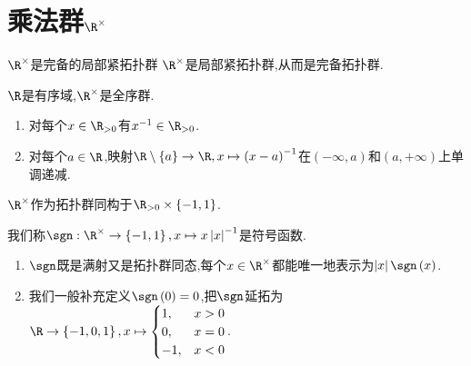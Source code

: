 \section{乘法群\texorpdfstring{$\R^{\times}$}{R*}}

\begin{proposition}{$\R^{\times}$是完备的局部紧拓扑群}{}
	$\R^{\times}$是局部紧拓扑群,从而是完备拓扑群.
\end{proposition}

\begin{proposition}{}{}
	$\R$是有序域,$\R^{\times}$是全序群.
\end{proposition}

\begin{proposition}{}{}
	\begin{enumerate}
		\item 对每个$x\in\R_{>0}$有$x^{-1}\in\R_{>0}$.
		\item 对每个$a\in\R$,映射$\R\setminus\left\{a\right\}\to\R,x\mapsto\left(x-a\right)^{-1}$在$\left(-\infty,a\right)$和$\left(a,+\infty\right)$上单调递减.
	\end{enumerate}
\end{proposition}

\begin{proposition}{}{}
	$\R^{\times}$作为拓扑群同构于$\R_{>0}\times\left\{-1,1\right\}$.
\end{proposition}

\begin{definition}{}{}
	我们称$\sgn:\R^{\times}\to\left\{-1,1\right\},x\mapsto x\left|x\right|^{-1}$是符号函数.
\end{definition}

\begin{remark}{}{}
	\begin{enumerate}
		\item $\sgn$既是满射又是拓扑群同态,每个$x\in\R^{\times}$都能唯一地表示为$\left|x\right|\sgn\left(x\right)$.
		\item 我们一般补充定义$\sgn\left(0\right)=0$,把$\sgn$延拓为$\R\to\left\{-1,0,1\right\},x\mapsto
		\begin{cases}
			1,&x>0\\
			0,&x=0\\
			-1,&x<0
		\end{cases}$.
	\end{enumerate}
\end{remark}



























